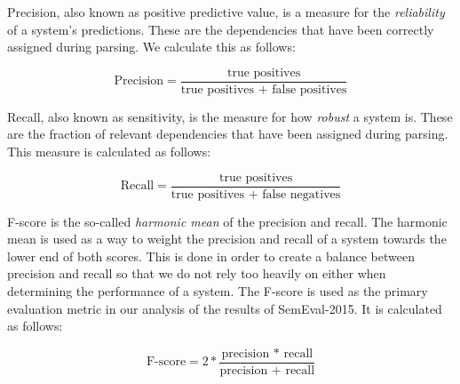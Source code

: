 Precision, also known as positive predictive value, is a measure for the \textit{reliability} of a system's predictions. These are the dependencies that have been correctly assigned during parsing. We calculate this as follows:

\begin{equation*}
    \text{Precision} = \frac{\text{true positives}}{\text{true positives + false positives}}
\end{equation*}

\vspace{1ex}

Recall, also known as sensitivity, is the measure for how \textit{robust} a system is. These are the fraction of relevant dependencies that have been assigned during parsing. This measure is calculated as follows:

\begin{equation*}
    \text{Recall} = \frac{\text{true positives}}{\text{true positives + false
            negatives}}
\end{equation*}

\vspace{1ex}

F-score is the so-called \textit{harmonic mean} of the precision and recall. The harmonic mean is used as a way to weight the precision and recall of a system towards the lower end of both scores. This is done in order to create a balance between precision and recall so that we do not rely too heavily on either when determining the performance of a system. The F-score is used as the primary evaluation metric in our analysis of the results of SemEval-2015. It is calculated as follows:

\begin{equation*}
    \text{F-score} = 2*\frac{\text{precision * recall}}{\text{precision + recall}}
\end{equation*}




